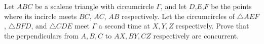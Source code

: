 Let $ABC$ be a scalene triangle with circumcircle $\Gamma$, and let $D$,$E$,$F$ be the points where its incircle meets $BC$, $AC$, $AB$ respectively. Let the circumcircles of $\triangle AEF$, $\triangle BFD$, and $\triangle CDE$ meet $\Gamma$ a second time at $X,Y,Z$ respectively. Prove that the perpendiculars from $A,B,C$ to $AX,BY,CZ$ respectively are concurrent.

